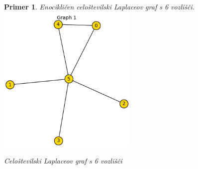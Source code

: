 \documentclass{article}
\newtheorem{primer}{Primer}
\begin{document}
\newpage
\begin{primer}
Enocikličen celoštevilski Laplaceov graf s 6 vozlišči. \\
        \centering
        \includegraphics[width=0.5\textwidth]{primer_6.png}
        \caption{Celoštevilski Laplaceov graf s 6 vozlišči}
       
   
\end{primer}
\end{document}
